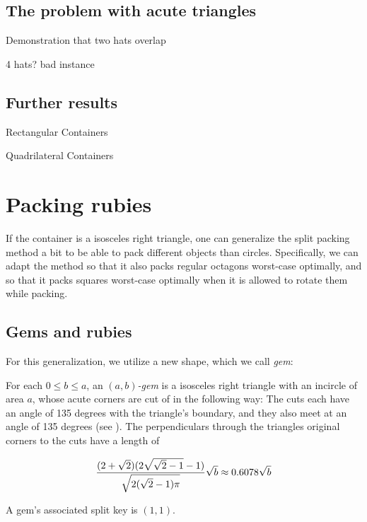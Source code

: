 \documentclass[a4paper,style=print,bibliography=totoc,nexus,lnum,extramargin]{tubsbook}
\begin{document}
%
%

\section{The problem with acute triangles}\label{sec:acute-triangles}

Demonstration that two hats overlap

4 hats? bad instance

\section{Further results}

Rectangular Containers
\label{sec:rectangles}

Quadrilateral Containers

\chapter{Packing rubies}

If the container is a isosceles right triangle, one can generalize the split packing method a bit to be able to pack different objects than circles. Specifically, we can adapt the method so that it also packs regular octagons worst-case optimally, and so that it packs squares worst-case optimally when it is allowed to rotate them while packing.

\section{Gems and rubies}

For this generalization, we utilize a new shape, which we call \emph{gem}:

\begin{definition}
    For each $0 \le b \le a$, an \emph{$(a,b)$-gem} is a isosceles right triangle with an incircle of area $a$, whose acute corners are cut of in the following way: The cuts each have an angle of 135 degrees with the triangle's boundary, and they also meet at an angle of 135 degrees (see ). The perpendiculars through the triangles original corners to the cuts have a length of

    $$\frac{(2+\sqrt{2})(2\sqrt{\sqrt{2}-1}-1)}{\sqrt{2(\sqrt{2}-1)\pi}}\sqrt{b} \approx 0.6078 \sqrt{b}$$

    A gem's associated split key is $(1,1)$.
\end{definition}
\end{document}
